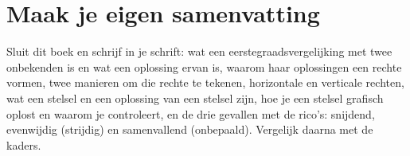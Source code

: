 \ifzelfstudie
\section*{Maak je eigen samenvatting}
Sluit dit boek en schrijf in je schrift: wat een eerstegraadsvergelijking met twee onbekenden is en wat een oplossing ervan is, waarom haar oplossingen een rechte vormen, twee manieren om die rechte te tekenen, horizontale en verticale rechten, wat een stelsel en een oplossing van een stelsel zijn, hoe je een stelsel grafisch oplost en waarom je controleert, en de drie gevallen met de rico's: snijdend, evenwijdig (strijdig) en samenvallend (onbepaald). Vergelijk daarna met de kaders.
\fi
